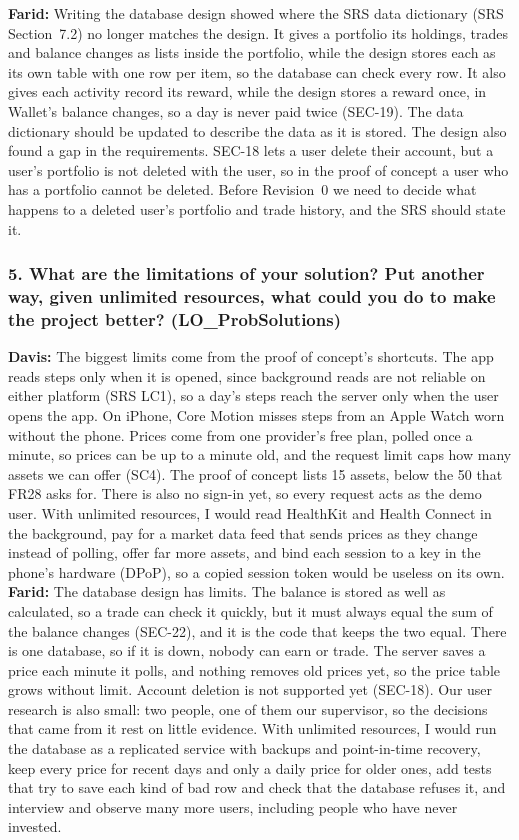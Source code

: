 \documentclass[12pt, titlepage]{article}
\begin{document}
\noindent\textbf{Farid:} Writing the database design showed where the
SRS data dictionary (SRS Section~7.2) no longer matches the design. It gives a
portfolio its holdings, trades and balance changes as lists inside the
portfolio, while the design stores each as its own table with one row per item,
so the database can check every row. It also gives each activity record its
reward, while the design stores a reward once, in Wallet's balance changes, so
a day is never paid twice (SEC-19). The data dictionary should be updated to
describe the data as it is stored. The design also found a gap in the
requirements. SEC-18 lets a user delete their account, but a user's portfolio
is not deleted with the user, so in the proof of concept a user who has a
portfolio cannot be deleted. Before Revision~0 we need to decide what happens
to a deleted user's portfolio and trade history, and the SRS should state it.

\subsubsection*{5. What are the limitations of your solution? Put another way,
given unlimited resources, what could you do to make the project better?
(LO\_ProbSolutions)}

\noindent\textbf{Davis:} The biggest limits come from the proof of concept's
shortcuts. The app reads steps only when it is opened, since background reads
are not reliable on either platform (SRS LC1), so a day's steps reach the
server only when the user opens the app. On iPhone, Core Motion misses steps
from an Apple Watch worn without the phone. Prices come from one provider's
free plan, polled once a minute, so prices can be up to a minute old, and the
request limit caps how many assets we can offer (SC4). The proof of concept
lists 15 assets, below the 50 that FR28 asks for. There is also no sign-in
yet, so every request acts as the demo user. With unlimited resources, I would
read HealthKit and Health Connect in the background, pay for a market data
feed that sends prices as they change instead of polling, offer far more
assets, and bind each session to a key in the phone's hardware (DPoP), so a
copied session token would be useless on its own. \\

\noindent\textbf{Farid:} The database design has limits. The balance is
stored as well as calculated, so a trade can check it quickly, but it must
always equal the sum of the balance changes (SEC-22), and it is the code that
keeps the two equal. There is one database, so if it is down, nobody can earn
or trade. The server saves a price each minute it polls, and nothing removes
old prices yet, so the price table grows without limit. Account deletion is not
supported yet (SEC-18). Our user research is also small: two people, one of
them our supervisor, so the decisions that came from it rest on little
evidence. With unlimited resources, I would run the database as a replicated
service with backups and point-in-time recovery, keep every price for recent
days and only a daily price for older ones, add tests that try to save each
kind of bad row and check that the database refuses it, and interview and
observe many more users, including people who have never invested.
\end{document}
